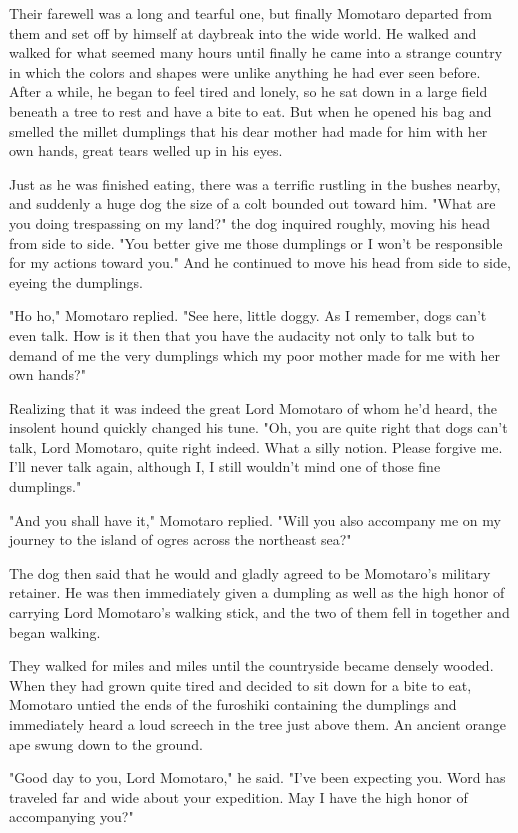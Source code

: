 Their farewell was a long and tearful one, but finally Momotaro departed from them and set off by himself at daybreak into the wide world. He walked and walked for what seemed many hours until finally he came into a strange country in which the colors and shapes were unlike anything he had ever seen before. After a while, he began to feel tired and lonely, so he sat down in a large field beneath a tree to rest and have a bite to eat. But when he opened his bag and smelled the millet dumplings that his dear mother had made for him with her own hands, great tears welled up in his eyes.

Just as he was finished eating, there was a terrific rustling in the bushes nearby, and suddenly a huge dog the size of a colt bounded out toward him. "What are you doing trespassing on my land?" the dog inquired roughly, moving his head from side to side. "You better give me those dumplings or I won't be responsible for my actions toward you." And he continued to move his head from side to side, eyeing the dumplings.

"Ho ho," Momotaro replied. "See here, little doggy. As I remember, dogs can't even talk. How is it then that you have the audacity not only to talk but to demand of me the very dumplings which my poor mother made for me with her own hands?"

Realizing that it was indeed the great Lord Momotaro of whom he'd heard, the insolent hound quickly changed his tune. "Oh, you are quite right that dogs can't talk, Lord Momotaro, quite right indeed. What a silly notion. Please forgive me. I'll never talk again, although I, I still wouldn't mind one of those fine dumplings."

"And you shall have it," Momotaro replied. "Will you also accompany me on my journey to the island of ogres across the northeast sea?"

The dog then said that he would and gladly agreed to be Momotaro's military retainer. He was then immediately given a dumpling as well as the high honor of carrying Lord Momotaro's walking stick, and the two of them fell in together and began walking.

They walked for miles and miles until the countryside became densely wooded. When they had grown quite tired and decided to sit down for a bite to eat, Momotaro untied the ends of the furoshiki containing the dumplings and immediately heard a loud screech in the tree just above them. An ancient orange ape swung down to the ground.

"Good day to you, Lord Momotaro," he said. "I've been expecting you. Word has traveled far and wide about your expedition. May I have the high honor of accompanying you?"

